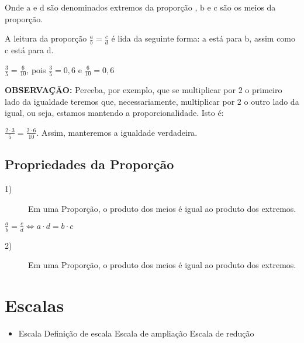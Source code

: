 Onde $\mathrm{a}$ e $\mathrm{d}$ são denominados extremos da proporção , $\mathrm{b}$ e $\mathrm{c}$ são os meios da proporção.

A leitura da proporção  $\frac{a}{b} = \frac{c}{d}$ é lida da seguinte forma: $\mathrm{a}$ está para $\mathrm{b}$, assim como $\mathrm{c}$ está para $\mathrm{d}$.

\begin{example}
    $\frac{3}{5}=\frac{6}{10}$, pois $\frac{3}{5}=0,6$ e $\frac{6}{10}=0,6$
\end{example}

\textbf{OBSERVAÇÃO:} Perceba, por exemplo, que se multiplicar por $2$ o primeiro lado da igualdade teremos que, necessariamente, multiplicar por $2$ o outro lado da igual, ou seja, estamos mantendo a proporcionalidade. Isto é:

\begin{example}
    $\frac{2 \cdot 3}{5}=\frac{2 \cdot 6}{10}$. Assim, manteremos a igualdade verdadeira. 
\end{example}

\subsection{Propriedades da Proporção}
    \begin{description}
    \item[1)] Em uma Proporção, o produto dos meios é igual ao produto dos extremos.
    \end{description}
 
 \begin{center}
    $\frac{a}{b} = \frac{c}{d} \Longleftrightarrow a\cdot d=b \cdot c$     
 \end{center}   

    \begin{description}
    \item[2)] Em uma Proporção, o produto dos meios é igual ao produto dos extremos. 
    \end{description}

\section{Escalas}

	\begin{itemize}
		\item Escala
		\subitem Definição de escala 
		\subitem Escala de ampliação
		\subitem Escala de redução
	\end{itemize}


